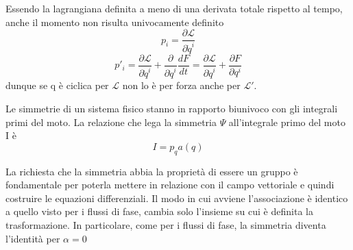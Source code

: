\documentclass[
10pt, %
a4paper, %
oneside, %
headinclude,footinclude, %
BCOR5mm, %
]{scrartcl}
\begin{document}
\begin{osservazione}
	Essendo la lagrangiana definita a meno di una derivata totale rispetto al tempo, anche il momento non risulta univocamente definito
	\[p_i = \frac{\partial \mathcal{L}}{\partial \dot{q}^i}\]
	\[p'_i = \frac{\partial \mathcal{L}}{\partial \dot{q}^i}+\frac{\partial}{\partial \dot{q}^i}\frac{dF}{dt} =  \frac{\partial \mathcal{L}}{\partial \dot{q}^i} +  \frac{\partial F}{\partial q^i} \]
	dunque se q è ciclica per $\mathcal{L}$ non lo è per forza anche per $\mathcal{L'}$.
\end{osservazione}
\begin{teorema}
	Le simmetrie di un sistema fisico stanno in rapporto biunivoco con gli integrali primi del moto. La relazione che lega la simmetria \(\Psi\) all'integrale primo del moto I è
	\[I = p_qa(q)\]
\end{teorema}
\begin{osservazione}
	La richiesta che la simmetria abbia la proprietà di essere un gruppo è fondamentale per poterla mettere in relazione con il campo vettoriale e quindi costruire le equazioni differenziali. Il modo in cui avviene l'associazione è identico a quello visto per i flussi di fase, cambia solo l'insieme su cui è definita la trasformazione. In particolare, come per i flussi di fase, la simmetria diventa l'identità per $\alpha= 0$
\end{osservazione}
\end{document}
